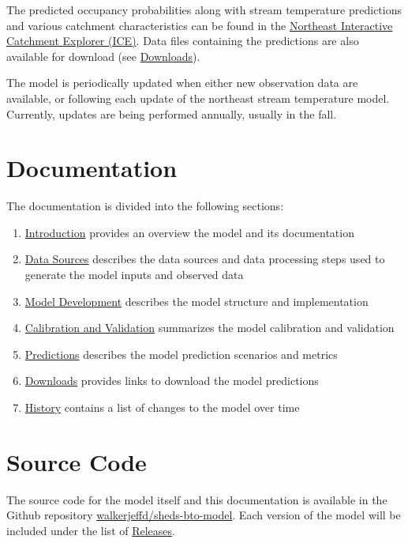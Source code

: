 \documentclass[
]{book}
\providecommand{\tightlist}{%
  \setlength{\itemsep}{0pt}\setlength{\parskip}{0pt}}
\begin{document}
The predicted occupancy probabilities along with stream temperature predictions and various catchment characteristics can be found in the \href{https://www.usgs.gov/apps/ecosheds/ice-northeast/}{Northeast Interactive Catchment Explorer (ICE)}. Data files containing the predictions are also available for download (see \protect\hyperlink{downloads}{Downloads}).

The model is periodically updated when either new observation data are available, or following each update of the northeast stream temperature model. Currently, updates are being performed annually, usually in the fall.

\hypertarget{documentation}{%
\section{Documentation}\label{documentation}}

The documentation is divided into the following sections:

\begin{enumerate}
\def\labelenumi{\arabic{enumi}.}
\tightlist
\item
  \protect\hyperlink{intro}{Introduction} provides an overview the model and its documentation
\item
  \protect\hyperlink{data-sources}{Data Sources} describes the data sources and data processing steps used to generate the model inputs and observed data
\item
  \protect\hyperlink{model-development}{Model Development} describes the model structure and implementation
\item
  \protect\hyperlink{calibration-and-validation}{Calibration and Validation} summarizes the model calibration and validation
\item
  \protect\hyperlink{predictions}{Predictions} describes the model prediction scenarios and metrics
\item
  \protect\hyperlink{downloads}{Downloads} provides links to download the model predictions
\item
  \protect\hyperlink{history}{History} contains a list of changes to the model over time
\end{enumerate}

\hypertarget{source-code}{%
\section{Source Code}\label{source-code}}

The source code for the model itself and this documentation is available in the Github repository \href{https://github.com/EcoSHEDS/northeast-bto-model}{walkerjeffd/sheds-bto-model}. Each version of the model will be included under the list of \href{https://github.com/EcoSHEDS/northeast-bto-model/releases}{Releases}.
\end{document}
